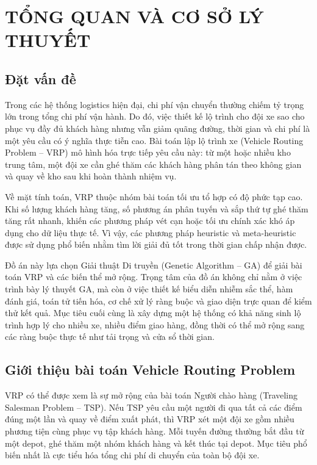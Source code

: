 \documentclass[12pt,a4paper]{article}
\numberwithin{figure}{subsection}
\numberwithin{table}{subsection}
\begin{document}

\newpage
\pagestyle{plain}
\setcounter{page}{1}

\section{TỔNG QUAN VÀ CƠ SỞ LÝ THUYẾT}

\subsection{Đặt vấn đề}
Trong các hệ thống logistics hiện đại, chi phí vận chuyển thường chiếm tỷ trọng lớn trong tổng chi phí vận hành. Do đó, việc thiết kế lộ trình cho đội xe sao cho phục vụ đầy đủ khách hàng nhưng vẫn giảm quãng đường, thời gian và chi phí là một yêu cầu có ý nghĩa thực tiễn cao. Bài toán lập lộ trình xe (Vehicle Routing Problem -- VRP) mô hình hóa trực tiếp yêu cầu này: từ một hoặc nhiều kho trung tâm, một đội xe cần ghé thăm các khách hàng phân tán theo không gian và quay về kho sau khi hoàn thành nhiệm vụ.

Về mặt tính toán, VRP thuộc nhóm bài toán tối ưu tổ hợp có độ phức tạp cao. Khi số lượng khách hàng tăng, số phương án phân tuyến và sắp thứ tự ghé thăm tăng rất nhanh, khiến các phương pháp vét cạn hoặc tối ưu chính xác khó áp dụng cho dữ liệu thực tế. Vì vậy, các phương pháp heuristic và meta-heuristic được sử dụng phổ biến nhằm tìm lời giải đủ tốt trong thời gian chấp nhận được.

Đồ án này lựa chọn Giải thuật Di truyền (Genetic Algorithm -- GA) để giải bài toán VRP và các biến thể mở rộng. Trọng tâm của đồ án không chỉ nằm ở việc trình bày lý thuyết GA, mà còn ở việc thiết kế biểu diễn nhiễm sắc thể, hàm đánh giá, toán tử tiến hóa, cơ chế xử lý ràng buộc và giao diện trực quan để kiểm thử kết quả. Mục tiêu cuối cùng là xây dựng một hệ thống có khả năng sinh lộ trình hợp lý cho nhiều xe, nhiều điểm giao hàng, đồng thời có thể mở rộng sang các ràng buộc thực tế như tải trọng và cửa sổ thời gian.

\subsection{Giới thiệu bài toán Vehicle Routing Problem}
VRP có thể được xem là sự mở rộng của bài toán Người chào hàng (Traveling Salesman Problem -- TSP). Nếu TSP yêu cầu một người đi qua tất cả các điểm đúng một lần và quay về điểm xuất phát, thì VRP xét một đội xe gồm nhiều phương tiện cùng phục vụ tập khách hàng. Mỗi tuyến đường thường bắt đầu từ một depot, ghé thăm một nhóm khách hàng và kết thúc tại depot. Mục tiêu phổ biến nhất là cực tiểu hóa tổng chi phí di chuyển của toàn bộ đội xe.
\end{document}
